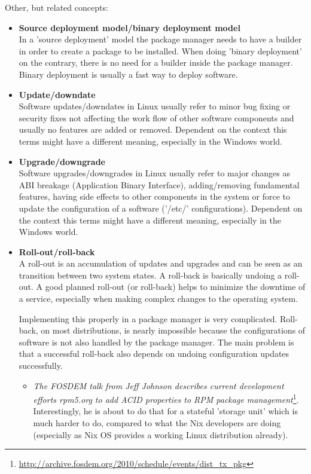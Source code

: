 \documentclass[a4paper,10pt]{article}
\begin{document}
Other, but related concepts:
\begin{itemize}
\item \textbf{Source deployment model/binary deployment model}\\
In a 'source deployment' model the package manager needs to have a builder in order to create a package to be installed. When doing 'binary deployment' on the contrary, there is no need for a builder inside the package manager. Binary deployment is usually a fast way to deploy software.

\item \textbf{Update/downdate}\\
Software updates/downdates in Linux usually refer to minor bug fixing or security fixes not affecting the work flow of other software components and usually no features are added or removed. Dependent on the context this terms might have a different meaning, especially in the Windows world.
\item \textbf{Upgrade/downgrade}\\
Software upgrades/downgrades in Linux usually refer to major changes as ABI breakage (Application Binary Interface), adding/removing fundamental features, having side effects to other components in the system or force to update the configuration of a software ('/etc/' configurations). Dependent on the context this terms might have a different meaning, especially in the Windows world.

\item \textbf{Roll-out/roll-back}\\
A roll-out is an accumulation of updates and upgrades and can be seen as an transition between two system states. A roll-back is basically undoing a roll-out. A good planned roll-out (or roll-back) helps to minimize the downtime of a service, especially when making complex changes to the operating system. 

Implementing this properly in a package manager is very complicated. Roll-back, on most distributions, is nearly impossible because the configurations of software is not also handled by the package manager. The main problem is that a successful roll-back also depends on undoing configuration updates successfully.
\begin{itemize}
\item \textit{The FOSDEM talk from Jeff Johnson describes current development efforts rpm5.org to add ACID properties to RPM package management}\footnote{\url{http://archive.fosdem.org/2010/schedule/events/dist_tx_pkg}}. \\
Interestingly, he is about to do that for a stateful 'storage unit' which is much harder to do, compared to what the Nix developers are doing (especially as Nix OS provides a working Linux distribution already).


\end{itemize}
\end{itemize}
\end{document}
